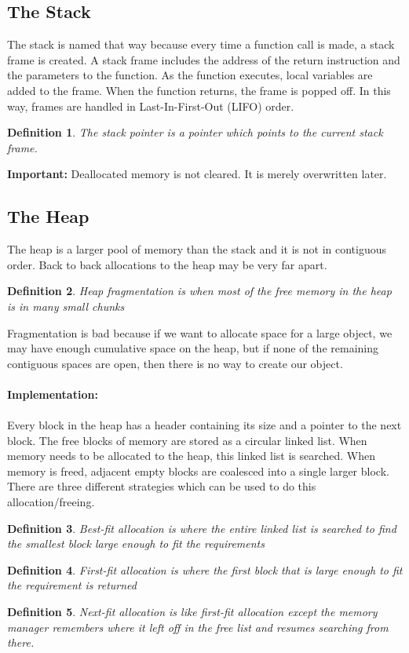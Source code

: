 \documentclass{article}
\newtheorem{definition}{Definition}
\begin{document}
\subsection{The Stack}
The stack is named that way because every time a function call is made, a stack frame is created.
A stack frame includes the address of the return instruction and the parameters to the function. As the function executes,
local variables are added to the frame. When the function returns, the frame is popped off. In this way, frames are handled in 
Last-In-First-Out (LIFO) order.
\begin{definition}
    The stack pointer is a pointer which points to the current stack frame.
\end{definition} 
\textbf{Important: }Deallocated memory is not cleared. It is merely overwritten later.
\subsection{The Heap}
The heap is a larger pool of memory than the stack and it is not in contiguous order. Back to back allocations to the heap may be very far apart.
\begin{definition}
    Heap fragmentation is when most of the free memory in the heap is in many small chunks
\end{definition}
Fragmentation is bad because if we want to allocate space for a large object, we may have enough cumulative space on the heap,
but if none of the remaining contiguous spaces are open, then there is no way to create our object.\\\\
\textbf{Implementation:}\\\\
Every block in the heap has a header containing its size and a pointer to the next block.
The free blocks of memory are stored as a circular linked list.
When memory needs to be allocated to the heap, this linked list is searched.
When memory is freed, adjacent empty blocks are coalesced into a single larger block.
There are three different strategies which can be used to do this allocation/freeing.
\begin{definition}
    Best-fit allocation is where the entire linked list is searched to find the smallest block large enough to fit the requirements
\end{definition}
\begin{definition}
    First-fit allocation is where the first block that is large enough to fit the requirement is returned
\end{definition}
\begin{definition}
    Next-fit allocation is like first-fit allocation except the memory manager remembers where it left off in the free list and resumes searching from there.
\end{definition}
\end{document}
